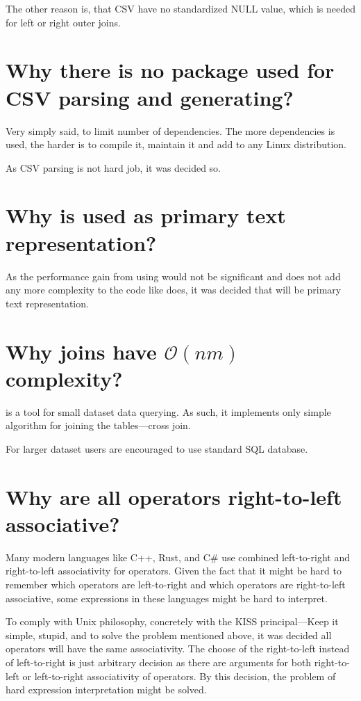 The other reason is, that CSV have no standardized NULL value, which is needed for left or right outer joins.

\section{Why there is no package used for CSV parsing and generating?}
Very simply said, to limit number of dependencies. The more dependencies is used, the harder is to compile it, maintain it and add to any Linux distribution.

As CSV parsing is not hard job, it was decided so.

\section{Why  is used as primary text representation?}
As the performance gain from using  would not be significant and  does not add any more complexity to the code like  does, 
it was decided that  will be primary text representation.

\section{Why joins have $\mathcal{O}(nm)$ complexity?}
 is a tool for small dataset data querying. As such, it implements only simple algorithm for joining the tables---cross join.

For larger dataset users are encouraged to use standard SQL database.

\section{Why are all operators right-to-left associative?}
Many modern languages like C++\cite{cpp-associativity-manual}, Rust\cite{rust-expressions}, and C\#\cite{csharp-expressions} use combined left-to-right and right-to-left associativity for operators.
Given the fact that it might be hard to remember which operators are left-to-right and which operators are right-to-left associative, some expressions in these languages might be hard to interpret.

To comply with Unix philosophy, concretely with the KISS principal---Keep it simple, stupid\cite{enwiki-kiss}, and to solve the problem mentioned above, it was decided all operators will have the same associativity.
The choose of the right-to-left instead of left-to-right is just arbitrary decision as there are arguments for both right-to-left or left-to-right associativity of operators.
By this decision, the problem of hard expression interpretation might be solved.
